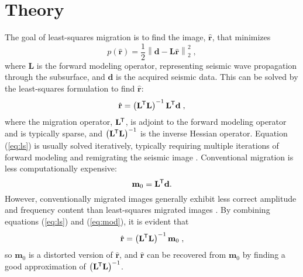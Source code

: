 \section{Theory}
The goal of least-squares migration is to find the image, $\hat{\mathbf{r}}$, that minimizes
\begin{equation}
p(\hat{\mathbf{r}}) = \frac{1}{2}\left \lVert \mathbf{\mathbf{d} - L\hat{r}} \right \rVert _2^2\;,
\end{equation}
where $\mathbf{L}$ is the forward modeling operator, representing seismic wave propagation through the subsurface, and $\mathbf{d}$ is the acquired seismic data.
This can be solved by the least-squares formulation to find $\hat{\mathbf{r}}$:
\begin{equation}
        \hat{\mathbf{r}} = \left ( \mathbf{L}^{\mkern-1.5mu\mathsf{T}}\mathbf{L}\right )^{-1}\mathbf{L}^{\mkern-1.5mu\mathsf{T}}\mathbf{d}\;,
        \label{eq:ls}
\end{equation}
where the migration operator, $\mathbf{L}^{\mkern-1.5mu\mathsf{T}}$, is adjoint to the forward modeling operator and is typically sparse, 
and $\left ( \mathbf{L}^{\mkern-1.5mu\mathsf{T}} \mathbf{L} \right )^{-1}$ is the inverse Hessian operator.
Equation (\ref{eq:ls}) is usually solved iteratively, typically requiring multiple iterations of forward modeling and remigrating the seismic image \cite[]{wem,xue16}. 
Conventional migration is less computationally expensive:
\begin{equation}
        \mathbf{m}_0 = \mathbf{L}^{\mkern-1.5mu\mathsf{T}}\mathbf{d}.
        \label{eq:mod}
\end{equation}
However, conventionally migrated images generally exhibit less correct amplitude and frequency content than least-squares migrated images \cite[]{dutta14}. 
By combining equations (\ref{eq:ls}) and (\ref{eq:mod}), it is evident that
\begin{equation}
        \hat{\mathbf{r}} = \left ( \mathbf{L}^{\mkern-1.5mu\mathsf{T}}\mathbf{L}\right )^{-1}\mathbf{m}_{0} \;,
\end{equation}
so $\mathbf{m}_0$ is a distorted version of $\hat{\mathbf{r}}$, and $\hat{\mathbf{r}}$ can be recovered from $\mathbf{m}_0$ by finding a good approximation of $\left ( \mathbf{L}^{\mkern-1.5mu\mathsf{T}}\mathbf{L}\right) ^{-1}$.

